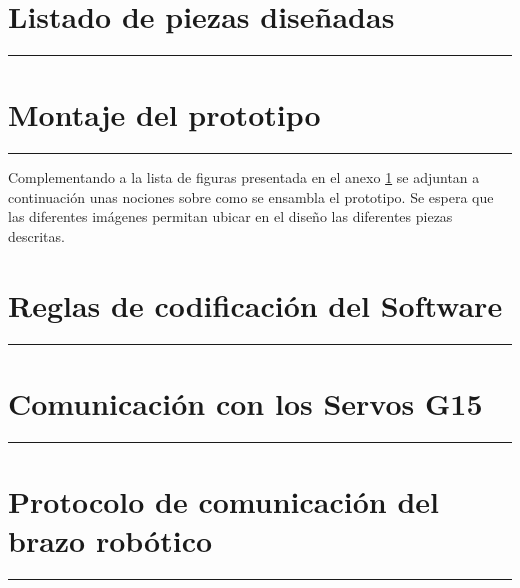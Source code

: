 \appendix
{}

	
	\chapter{Listado de piezas diseñadas} \label{app:listadoPiezas}
		\hrule
		\vspace{3mm}
		
	
	\chapter{Montaje del prototipo} \label{app:montajePiezas}
		\hrule
		\vspace{3mm}
		Complementando a la lista de figuras presentada en el anexo \ref{app:listadoPiezas} se adjuntan a continuación unas nociones sobre como se ensambla el prototipo. Se espera que las diferentes imágenes permitan ubicar en el diseño las diferentes piezas descritas.
		
		\begin{landscape}
		    	
		\end{landscape}
	
	\chapter{Reglas de codificación del Software} \label{app:codificacionSW}
		\hrule
		\vspace{3mm}
		
	
	
	\chapter{Comunicación con los Servos G15} \label{app:registros_g15}
		\hrule
		\vspace{3mm}
		
	
	\chapter{Protocolo de comunicación del brazo robótico} \label{app:comunicacion_brazo}
		\hrule
		\vspace{3mm}
		


